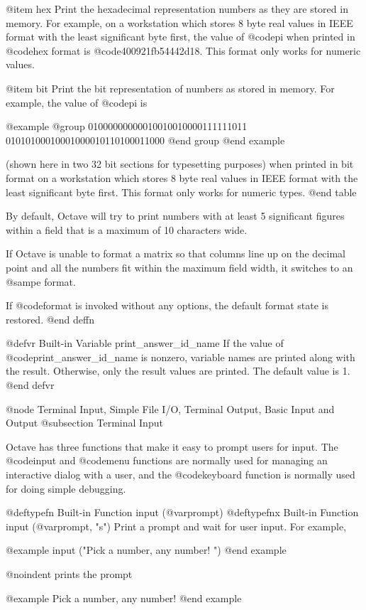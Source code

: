 @item hex
Print the hexadecimal representation numbers as they are stored in
memory.  For example, on a workstation which stores 8 byte real values
in IEEE format with the least significant byte first, the value of
@code{pi} when printed in @code{hex} format is @code{400921fb54442d18}.
This format only works for numeric values.

@item bit
Print the bit representation of numbers as stored in memory.
For example, the value of @code{pi} is

@example
@group
01000000000010010010000111111011
01010100010001000010110100011000
@end group
@end example

(shown here in two 32 bit sections for typesetting purposes) when
printed in bit format on a workstation which stores 8 byte real values
in IEEE format with the least significant byte first.  This format only
works for numeric types.
@end table

By default, Octave will try to print numbers with at least 5 significant
figures within a field that is a maximum of 10 characters wide.

If Octave is unable to format a matrix so that columns line up on the
decimal point and all the numbers fit within the maximum field width,
it switches to an @samp{e} format.

If @code{format} is invoked without any options, the default format
state is restored.
@end deffn

@defvr {Built-in Variable} print_answer_id_name
If the value of @code{print_answer_id_name} is nonzero, variable
names are printed along with the result.  Otherwise, only the result
values are printed.  The default value is 1.
@end defvr

@node Terminal Input, Simple File I/O, Terminal Output, Basic Input and Output
@subsection Terminal Input

Octave has three functions that make it easy to prompt users for
input.  The @code{input} and @code{menu} functions are normally
used for managing an interactive dialog with a user, and the
@code{keyboard} function is normally used for doing simple debugging.

@deftypefn {Built-in Function} {} input (@var{prompt})
@deftypefnx {Built-in Function} {} input (@var{prompt}, "s")
Print a prompt and wait for user input.  For example,

@example
input ("Pick a number, any number! ")
@end example

@noindent
prints the prompt

@example
Pick a number, any number!
@end example

